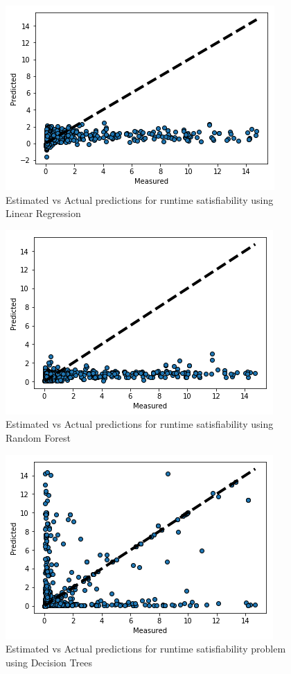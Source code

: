 \documentclass{article}
\begin{document}
	\begin{figure}
		\centering
		\includegraphics[width=0.7\linewidth]{graphs/LR/est-act-predict-LR-sat}
		\caption{Estimated vs Actual predictions for runtime satisfiability using Linear Regression}
		\label{fig:est-act-predict-mnl-sat}
	\end{figure}
	\begin{figure}
		\centering
		\includegraphics[width=0.7\linewidth]{graphs/RF/est-act-predict-RF-sat}
		\caption{Estimated vs Actual predictions for runtime satisfiability using Random Forest}
		\label{fig:est-act-predict-rf-sat}
	\end{figure}
	\begin{figure}
		\centering
		\includegraphics[width=0.7\linewidth]{graphs/DT/est-act-predict-DT-sat}
		\caption{Estimated vs Actual predictions for runtime satisfiability problem using Decision Trees}
		\label{fig:est-act-predict-dt-sat}
	\end{figure}
\end{document}
